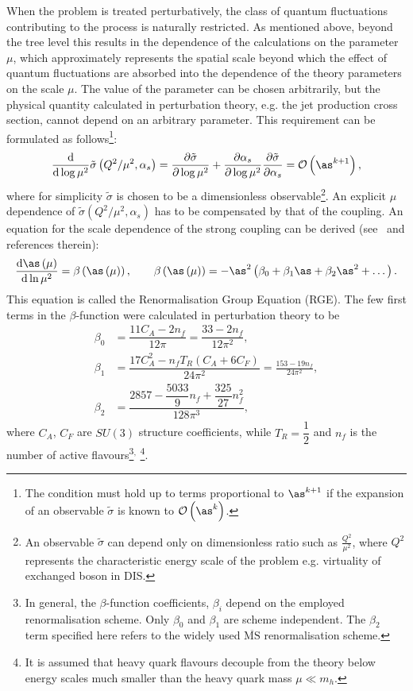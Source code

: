 When the problem is treated perturbatively, the class of quantum fluctuations contributing to the process is naturally restricted. As mentioned above, beyond the tree level this results in the dependence of the calculations on the parameter $\mu$, which approximately represents the spatial scale beyond which the effect of quantum fluctuations are absorbed into the dependence of the theory parameters on the scale $\mu$. The value of the parameter can be chosen arbitrarily, but the physical quantity calculated in perturbation theory, e.g. the jet production cross section, cannot depend on an arbitrary parameter. This requirement can be formulated as follows\footnote{The condition must hold up to terms proportional to $\as^{k+1}$ if the expansion of an observable $\tilde{\sigma}$ is known to $\mathcal{O}\left(\as^{k}\right)$.}:
\begin{equation}
 \frac{\mathrm{d}}{\mathrm{d}\log{\mu^2}} \tilde{\sigma} \left( Q^2/\mu^2, \alpha_s \right) = \frac{\partial \tilde{\sigma} }{\partial \log{\mu^2}} + \frac{\partial \alpha_s }{\partial \log{\mu^2}}\frac{\partial \tilde{\sigma} }{\partial \alpha_s} = \mathcal{O}\left(\as^{k+1}\right),
\end{equation}
where for simplicity $\tilde{\sigma}$ is chosen to be a dimensionless observable\footnote{An observable $\tilde{\sigma}$ can depend only on dimensionless ratio such as $\frac{Q^2}{\mu^2}$, where $Q^2$ represents the characteristic energy scale of the problem e.g. virtuality of exchanged boson in DIS.}. An explicit $\mu$ dependence of $\tilde{\sigma} \left( Q^2/\mu^2, \alpha_s \right)$ has to be compensated by that of the coupling. An equation for the scale dependence of the strong coupling can be derived (see~\cite{QCDrge:2014} and references therein):
 \begin{equation}
   \frac{\mathrm{d}\as\left(\mu\right)}{\mathrm{d}\ln{\mu^2}} = \beta\left(\as\left(\mu\right)\right),\qquad \beta\left(\as\left(\mu\right)\right) = -\as^2\left(\beta_0 + \beta_1\as + \beta_2\as^2 + \dots \right).
 \label{eq:asrunnig}
 \end{equation}
This equation is called the Renormalisation Group Equation (RGE). The few first terms in the $\beta$-function were calculated in perturbation theory to be
\begin{align}
	\beta_0 &= \dfrac{11C_A-2n_f}{12\pi} = \dfrac{33 - 2n_f}{12\pi^2},\\
	\beta_1 &= \dfrac{17C_A^2-n_fT_R\left(C_A+6C_F\right)}{24\pi^2} = \frac{153-19n_f}{24\pi^2},\\
	\beta_2 &= \dfrac{2857-\dfrac{5033}{9}n_f+\dfrac{325}{27}n_f^2}{128\pi^3},
\end{align}
where $C_A$, $C_F$ are $SU\left(3\right)$ structure coefficients, while $T_R=\dfrac{1}{2}$ and $n_f$ is the number of active flavours\footnote{In general, the $\beta$-function coefficients, $\beta_i$ depend on the employed renormalisation scheme. Only $\beta_0$ and $\beta_1$ are scheme independent. The $\beta_2$ term specified here refers to the widely used $\overline{\mathrm{MS}}$ renormalisation scheme.}$^,$
\footnote{It is assumed that heavy quark flavours decouple from the theory below energy scales much smaller than the heavy quark mass $\mu \ll m_h$.}. 

